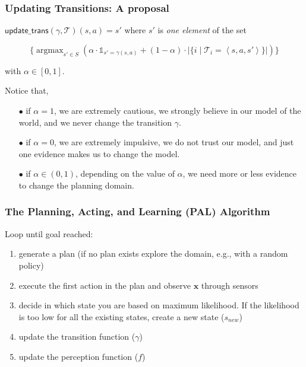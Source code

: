 \documentclass{beamer}
\DeclareMathOperator*{\argmax}{argmax}
\def\updgamma{\mathsf{update\_trans}}
\def\bx{\pmb{x}}
\def\T{\mathcal{T}}
\begin{document}
\begin{frame} 
  \frametitle{Updating Transitions: A proposal} 

$\updgamma(\gamma,\T)(s,a)=s'$  where $s'$ is \emph{one element}
of the set

$$
\{\argmax_{s'\in S}\left(\alpha\cdot\mathbb{1}_{s'=\gamma(s,a)}+
    (1-\alpha)\cdot|\{i\mid \T_i=\left<s,a,s'\right>\}|
\right)\}
$$

with $\alpha\in[0,1]$.

\pause
\vspace{1cm}
Notice that,
\begin{itemize}
\item[$\bullet$] 
if {\color {red} $\alpha = 1$}, we are extremely cautious, we strongly believe in our
model of the world, and we never change the transition $\gamma$.
\pause
\item[$\bullet$] 
if {\color {red} $\alpha = 0$}, we are extremely impulsive, we do not trust our model,
and just one evidence makes us to change the model.
\pause
\item[$\bullet$] 
if {\color {red} $\alpha \in (0,1)$}, depending on the value of
$\alpha$, we need more or less evidence to change the planning
domain.
\end{itemize}
\end{frame}

\begin{frame}
\frametitle{The Planning, Acting, and Learning (PAL) Algorithm}
Loop until goal reached: 
\begin{enumerate}
\item generate a plan (if no plan exists explore the domain, e.g., with a random policy) 
\item execute the first action in the plan and observe $\bx$ through sensors
\item decide in which state you are based on maximum likelihood. If the likelihood  is too low for all the existing states, create a new state ($s_{new}$)
\item update the transition function ($\gamma$) 
\item \alert<2>{update the perception function ($f$)}
\end{enumerate}
\end{frame}
\end{document}
